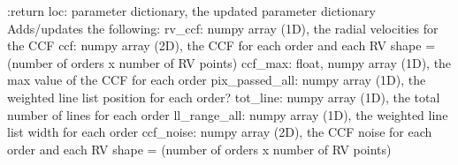 \begin{minipage}{\textwidth}
\begin{pythondocstring}
:return loc: parameter dictionary, the updated parameter dictionary
        Adds/updates the following:
            rv_ccf: numpy array (1D), the radial velocities for the CCF
            ccf: numpy array (2D), the CCF for each order and each RV
                 shape = (number of orders x number of RV points)
            ccf_max: float, numpy array (1D), the max value of the CCF for
                     each order
            pix_passed_all: numpy array (1D), the weighted line list
                            position for each order?
            tot_line: numpy array (1D), the total number of lines for each
                      order
            ll_range_all: numpy array (1D), the weighted line list width for
                      each order
            ccf_noise: numpy array (2D), the CCF noise for each order and
                       each RV
                       shape = (number of orders x number of RV points)
\end{pythondocstring}
\end{minipage}

